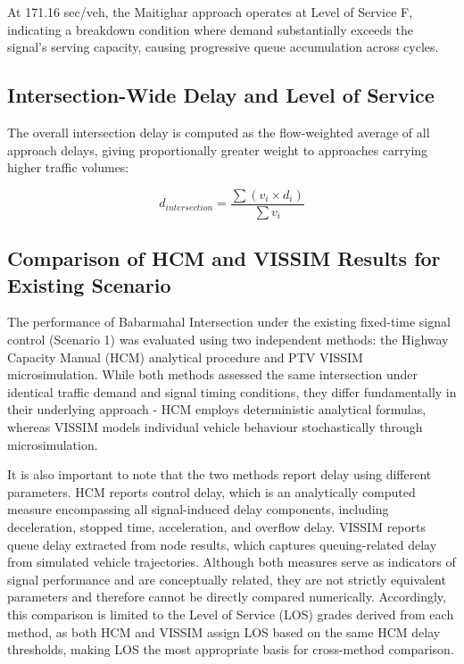 At 171.16 sec/veh, the Maitighar approach operates at 
Level of Service F, indicating a breakdown condition 
where demand substantially exceeds the signal's serving 
capacity, causing progressive queue accumulation across 
cycles. 

\subsection{Intersection-Wide Delay and Level of Service}
The overall intersection delay is computed as the 
flow-weighted average of all approach delays, giving 
proportionally greater weight to approaches carrying higher 
traffic volumes:

\begin{equation}
    d_{intersection} = \frac{\sum(v_i\times d_i) }{\sum v_i}
\end{equation}


\subsection{Comparison of HCM and VISSIM Results for Existing Scenario}

The performance of Babarmahal Intersection under the existing 
fixed-time signal control (Scenario 1) was evaluated using 
two independent methods: the Highway Capacity Manual (HCM) 
analytical procedure and PTV VISSIM microsimulation. While 
both methods assessed the same intersection under identical 
traffic demand and signal timing conditions, they differ 
fundamentally in their underlying approach - HCM employs 
deterministic analytical formulas, whereas VISSIM models 
individual vehicle behaviour stochastically through 
microsimulation.

It is also important to note that the two methods report 
delay using different parameters. HCM reports control delay, 
which is an analytically computed measure encompassing all 
signal-induced delay components, including deceleration, 
stopped time, acceleration, and overflow delay. VISSIM 
reports queue delay extracted from node results, which 
captures queuing-related delay from simulated vehicle 
trajectories. Although both measures serve as indicators 
of signal performance and are conceptually related, they 
are not strictly equivalent parameters and therefore cannot 
be directly compared numerically. Accordingly, this 
comparison is limited to the Level of Service (LOS) grades 
derived from each method, as both HCM and VISSIM assign LOS 
based on the same HCM delay thresholds, making LOS the most 
appropriate basis for cross-method comparison.

